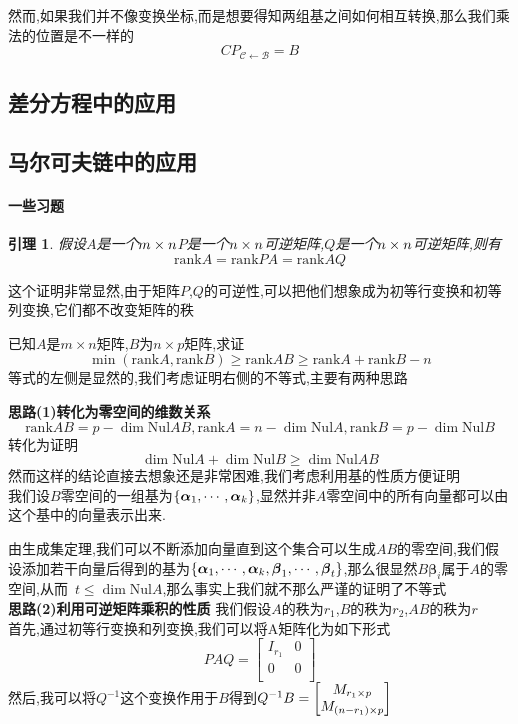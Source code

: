 \documentclass{article}
\newtheorem{lemma}{引理}[subsection]
\newenvironment{cproof}{%
\heiti{证明}\kaishu
}{%
}
\newcommand{\ve}{\boldsymbol}
\begin{document}
\begin{CJK}{UTF8}{gkai}
然而,如果我们并不像变换坐标,而是想要得知两组基之间如何相互转换,那么我们乘法的位置是不一样的
\[C P_{\mathcal{C}\leftarrow\mathcal{B}} = B\]
\subsection{差分方程中的应用}

\subsection{马尔可夫链中的应用}

\paragraph{一些习题\\}
\begin{lemma}
假设$A$是一个$m\times n$$P$是一个$n\times n$可逆矩阵,$Q$是一个$n\times n$可逆矩阵,则有
\[\text{rank} A = \text{rank} PA = \text{rank} AQ\]
\end{lemma}
\begin{cproof}
    这个证明非常显然,由于矩阵$P$,$Q$的可逆性,可以把他们想象成为初等行变换和初等列变换,它们都不改变矩阵的秩\\
\end{cproof}

已知$A$是$m\times n$矩阵,$B$为$n\times p$矩阵,求证\\
\[\min(\text{rank} A,\text{rank} B) \geq \text{rank} AB \geq \text{rank} A  + \text{rank} B - n\]
等式的左侧是显然的,我们考虑证明右侧的不等式,主要有两种思路\\
\begin{cproof}
\textbf{思路(1)转化为零空间的维数关系}
\[\text{rank} AB = p - \dim \text{Nul} AB , \text{rank} A = n - \dim \text{Nul} A, \text{rank} B = p - \dim \text{Nul} B\] 
转化为证明
\[\dim \text{Nul} A + \dim \text{Nul} B\geq \dim \text{Nul} AB\]
然而这样的结论直接去想象还是非常困难,我们考虑利用基的性质方便证明\\
我们设$B$零空间的一组基为$\{\vs{\alpha}{1}{k}\}$,显然并非$A$零空间中的所有向量都可以由这个基中的向量表示出来.

由生成集定理,我们可以不断添加向量直到这个集合可以生成$AB$的零空间,我们假设添加若干向量后得到的基为$\{\vs{\alpha}{1}{k},\vs{\beta}{1}{t}\}$,那么很显然$B\ve{\beta}_i$属于$A$的零空间,从而~$t\leq \dim \text{Nul} A$,那么事实上我们就不那么严谨的证明了不等式\\

\textbf{思路(2)利用可逆矩阵乘积的性质}
我们假设$A$的秩为$r_1$,$B$的秩为$r_2$,$AB$的秩为$r$\\
首先,通过初等行变换和列变换,我们可以将A矩阵化为如下形式
\[ P A Q= \begin{bmatrix}
    I_{r_1}& 0\\
    0&0\\
\end{bmatrix}\]
然后,我可以将$Q^{-1}$这个变换作用于$B$得到$Q^{-1} B =\begin{bmatrix}
 M_{r_1\times p} \\
 M_{(n - r_1)\times p}  \\
\end{bmatrix}$\\


\end{cproof}
\end{CJK}
\end{document}
